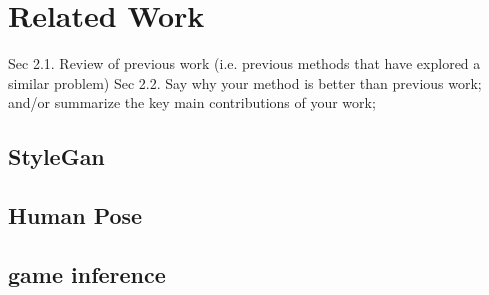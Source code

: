 \section{Related Work}
Sec 2.1. Review of previous work (i.e. previous methods that have explored a similar problem)
Sec 2.2. Say why your method is better than previous work; and/or summarize the key main contributions of your work;
\subsection{StyleGan}
\subsection{Human Pose}
\subsection{game inference}